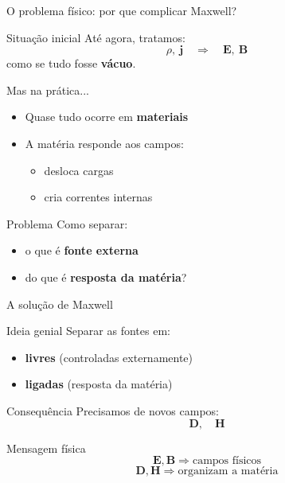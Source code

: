 \documentclass[aspectratio=169]{beamer}
\begin{document}
\begin{frame}{O problema físico: por que complicar Maxwell?}

\begin{block}{Situação inicial}
Até agora, tratamos:
\[
\rho,\ \mathbf{j} \quad \Rightarrow \quad \mathbf{E},\ \mathbf{B}
\]
como se tudo fosse \textbf{vácuo}.
\end{block}

\pause

\begin{block}{Mas na prática...}
\begin{itemize}
\item Quase tudo ocorre em \textbf{materiais}
\item A matéria responde aos campos:
\begin{itemize}
\item desloca cargas
\item cria correntes internas
\end{itemize}
\end{itemize}
\end{block}

\end{frame}

\begin{frame}[plain]

\begin{alertblock}{Problema}
Como separar:
\begin{itemize}
\item o que é \textbf{fonte externa}
\item do que é \textbf{resposta da matéria}?
\end{itemize}
\end{alertblock}

\end{frame}


\begin{frame}{A solução de Maxwell}

\begin{block}{Ideia genial}
Separar as fontes em:
\begin{itemize}
\item \textbf{livres} (controladas externamente)
\item \textbf{ligadas} (resposta da matéria)
\end{itemize}
\end{block}

\pause

\begin{block}{Consequência}
Precisamos de novos campos:
\[
\mathbf{D}, \quad \mathbf{H}
\]
\end{block}

\pause

\begin{alertblock}{Mensagem física}
\[
\mathbf{E}, \mathbf{B} \Rightarrow \text{campos físicos}
\]
\[
\mathbf{D}, \mathbf{H} \Rightarrow \text{organizam a matéria}
\]
\end{alertblock}

\end{frame}
\end{document}
